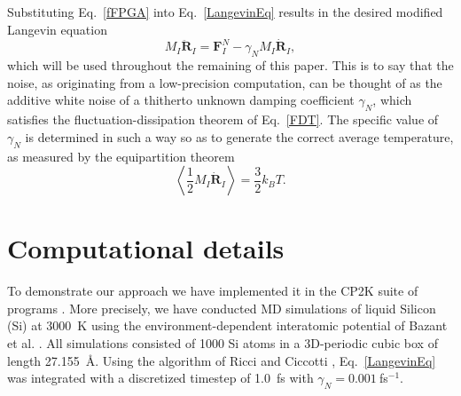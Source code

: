 \documentclass[format=acmsmall,urlbreakonhyphens]{acmart}
\begin{document}
Substituting Eq.~\ref{fFPGA} into Eq.~\ref{LangevinEq} results in the desired modified Langevin equation
\begin{equation} \label{modLangevin}
M_{I}\ddot{\textbf{R}}_{I} = \textbf{F}_{I}^{N}-\gamma _{N}M_{I}\dot{\textbf{R}}_{I},
\end{equation}
which will be used throughout the remaining of this paper. This is to say that the noise, as originating from a low-precision computation, can be thought of as the additive white noise of a thitherto unknown damping coefficient $\gamma_N$, which satisfies the fluctuation-dissipation theorem of Eq.~\ref{FDT}.  The specific value of $\gamma_N$ is determined in such a way so as to generate the correct average temperature, as measured by the equipartition theorem
\begin{equation}
\left\langle \frac{1}{2} M_I \dot{\textbf{R}}_{I} \right\rangle = \frac{3}{2} k_B T.
\label{EquiPartTheorem}
\end{equation}




\section{Computational details}
\label{sec:computational}
To demonstrate our approach we have implemented it in the CP2K suite of programs \cite{cp2k}. More precisely, we have conducted MD simulations of liquid Silicon (Si) at 3000~K using the environment-dependent interatomic potential of Bazant et al. \cite{EIP1,EIP2}.
All simulations consisted of 1000 Si atoms in a 3D-periodic cubic box of length 27.155~\AA. Using the algorithm of Ricci and Ciccotti \cite{Ricci}, Eq.~\ref{LangevinEq} was integrated with a discretized timestep of 1.0~fs with $\gamma_N = 0.001~$fs$^{-1}$.
\end{document}
